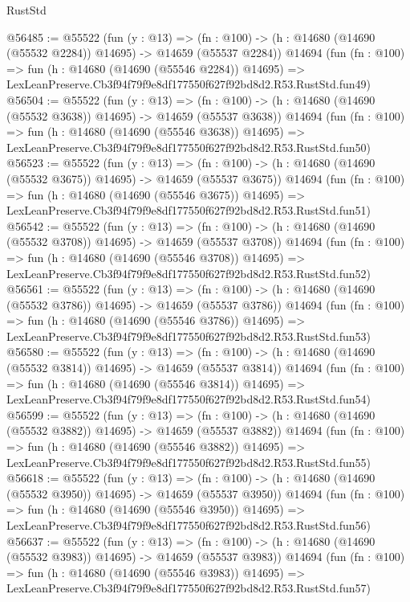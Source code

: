 \begin{lexlean}{RustStd}
\begin{coremodule}
@56485 := @55522
    (fun (y : @13) =>
    (fn : @100) -> (h : @14680 (@14690 (@55532 @2284)) @14695) -> @14659 (@55537 @2284))
    @14694
    (fun (fn : @100) =>
    fun (h : @14680 (@14690 (@55546 @2284)) @14695) =>
    LexLeanPreserve.Cb3f94f79f9e8df177550f627f92bd8d2.R53.RustStd.fun49)
@56504 := @55522
    (fun (y : @13) =>
    (fn : @100) -> (h : @14680 (@14690 (@55532 @3638)) @14695) -> @14659 (@55537 @3638))
    @14694
    (fun (fn : @100) =>
    fun (h : @14680 (@14690 (@55546 @3638)) @14695) =>
    LexLeanPreserve.Cb3f94f79f9e8df177550f627f92bd8d2.R53.RustStd.fun50)
@56523 := @55522
    (fun (y : @13) =>
    (fn : @100) -> (h : @14680 (@14690 (@55532 @3675)) @14695) -> @14659 (@55537 @3675))
    @14694
    (fun (fn : @100) =>
    fun (h : @14680 (@14690 (@55546 @3675)) @14695) =>
    LexLeanPreserve.Cb3f94f79f9e8df177550f627f92bd8d2.R53.RustStd.fun51)
@56542 := @55522
    (fun (y : @13) =>
    (fn : @100) -> (h : @14680 (@14690 (@55532 @3708)) @14695) -> @14659 (@55537 @3708))
    @14694
    (fun (fn : @100) =>
    fun (h : @14680 (@14690 (@55546 @3708)) @14695) =>
    LexLeanPreserve.Cb3f94f79f9e8df177550f627f92bd8d2.R53.RustStd.fun52)
@56561 := @55522
    (fun (y : @13) =>
    (fn : @100) -> (h : @14680 (@14690 (@55532 @3786)) @14695) -> @14659 (@55537 @3786))
    @14694
    (fun (fn : @100) =>
    fun (h : @14680 (@14690 (@55546 @3786)) @14695) =>
    LexLeanPreserve.Cb3f94f79f9e8df177550f627f92bd8d2.R53.RustStd.fun53)
@56580 := @55522
    (fun (y : @13) =>
    (fn : @100) -> (h : @14680 (@14690 (@55532 @3814)) @14695) -> @14659 (@55537 @3814))
    @14694
    (fun (fn : @100) =>
    fun (h : @14680 (@14690 (@55546 @3814)) @14695) =>
    LexLeanPreserve.Cb3f94f79f9e8df177550f627f92bd8d2.R53.RustStd.fun54)
@56599 := @55522
    (fun (y : @13) =>
    (fn : @100) -> (h : @14680 (@14690 (@55532 @3882)) @14695) -> @14659 (@55537 @3882))
    @14694
    (fun (fn : @100) =>
    fun (h : @14680 (@14690 (@55546 @3882)) @14695) =>
    LexLeanPreserve.Cb3f94f79f9e8df177550f627f92bd8d2.R53.RustStd.fun55)
@56618 := @55522
    (fun (y : @13) =>
    (fn : @100) -> (h : @14680 (@14690 (@55532 @3950)) @14695) -> @14659 (@55537 @3950))
    @14694
    (fun (fn : @100) =>
    fun (h : @14680 (@14690 (@55546 @3950)) @14695) =>
    LexLeanPreserve.Cb3f94f79f9e8df177550f627f92bd8d2.R53.RustStd.fun56)
@56637 := @55522
    (fun (y : @13) =>
    (fn : @100) -> (h : @14680 (@14690 (@55532 @3983)) @14695) -> @14659 (@55537 @3983))
    @14694
    (fun (fn : @100) =>
    fun (h : @14680 (@14690 (@55546 @3983)) @14695) =>
    LexLeanPreserve.Cb3f94f79f9e8df177550f627f92bd8d2.R53.RustStd.fun57)

\end{coremodule}
\end{lexlean}
